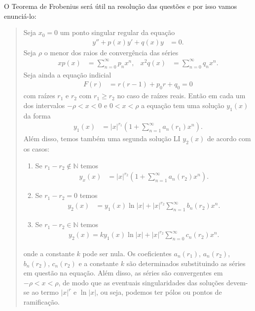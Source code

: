 \documentclass[a4paper,12pt, leqno, answers]{exam}
\begin{document}
\thispagestyle{headandfoot}
O Teorema de Frobenius ser\'{a} útil na resolu\c{c}\~{a}o das quest\~{o}es e por isso vamos enunci\'{a}-lo:
\begin{quote}
    Seja $x_0 = 0$ um ponto singular regular da equa\c{c}\~{a}o
    \begin{align*}
        y'' + p(x) y' + q(x) y &= 0.
    \end{align*}
    Seja $\rho$ o menor dos raios de converg\^{e}ncia das s\'{e}ries
    \begin{align*}
        x p(x) &= \sum_{n = 0}^\infty p_n x^n, & x^2 q(x) &= \sum_{n = 0}^\infty q_n x^n.
    \end{align*}
    Seja ainda a equa\c{c}\~{a}o indicial
    \begin{align*}
        F(r) &= r \left( r - 1 \right) + p_0 r + q_0 = 0
    \end{align*}
    com ra\'{i}zes $r_1$ e $r_2$ com $r_1 \geq r_2$ no caso de ra\'{i}zes reais. Ent\~{a}o em cada um dos intervalos $-\rho < x < 0$ e $0 < x < \rho$ a equa\c{c}\~{a}o tem uma solu\c{c}\~{a}o $y_1(x)$ da forma
    \begin{align*}
        y_1(x) &= |x|^{r_1} \left( 1 + \sum_{n = 1}^\infty a_n(r_1) x^n \right).
    \end{align*}
    Al\'{e}m disso, temos tamb\'{e}m uma segunda solu\c{c}\~{a}o LI $y_2(x)$ de acordo com os casos:
    \begin{enumerate}
        \item Se $r_1 - r_2 \not\in \mathbb{N}$ temos
            \begin{align*}
                y_x(x) &= |x|^{r_2} \left( 1 + \sum_{n = 1}^\infty a_n(r_2) x^n \right).
            \end{align*}
        \item Se $r_1 - r_2 = 0$ temos
            \begin{align*}
                y_2(x) &= y_1(x) \ln |x| + |x|^{r_2} \sum_{n = 1}^\infty b_n(r_2) x^n.
            \end{align*}
        \item Se $r_1 - r_2 \in \mathbb{N}$ temos
            \begin{align*}
                y_2(x) = k y_1(x) \ln |x| + |x|^{r_2} \sum_{n = 0}^\infty c_n(r_2) x^n.
            \end{align*}
    \end{enumerate}
    onde a constante $k$ pode ser nula. Os coeficientes $a_n(r_1)$, $a_n(r_2)$, $b_n(r_2)$, $c_n(r_2)$ e a constante $k$ s\~{a}o determinados substituindo as s\'{e}ries em quest\~{a}o na equa\c{c}\~{a}o. Al\'{e}m disso, as s\'{e}ries s\~{a}o convergentes em $-\rho < x < \rho$, de modo que as eventuais singularidades das solu\c{c}\~{o}es devem-se ao termo $|x|^r$ e $\ln |x|$, ou seja, podemos ter p\'{o}los ou pontos de ramifica\c{c}\~{a}o.
\end{quote}
\end{document}

